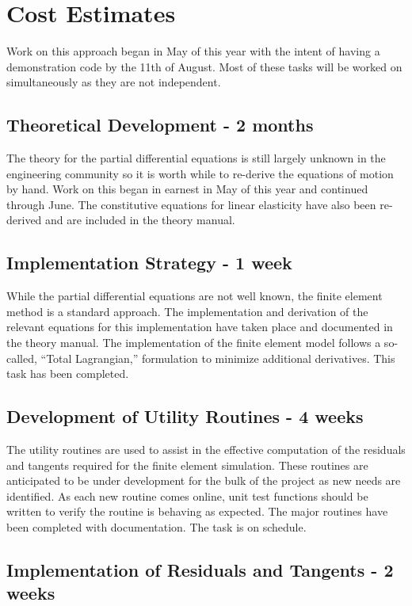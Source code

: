 \section{Cost Estimates}

Work on this approach began in May of this year with the intent of having a demonstration code by the 11th of August. Most of these tasks will be worked on simultaneously as they are not independent.

\subsection{Theoretical Development - 2 months}
The theory for the partial differential equations is still largely unknown in the engineering community so it is worth while to re-derive the equations of motion by hand. Work on this began in earnest in May of this year and continued through June. The constitutive equations for linear elasticity have also been re-derived and are included in the theory manual.

\subsection{Implementation Strategy - 1 week}

While the partial differential equations are not well known, the finite element method is a standard approach. The implementation and derivation of the relevant equations for this implementation have taken place and documented in the theory manual. The implementation of the finite element model follows a so-called, ``Total Lagrangian,'' formulation to minimize additional derivatives. This task has been completed.

\subsection{Development of Utility Routines - 4 weeks}

The utility routines are used to assist in the effective computation of the residuals and tangents required for the finite element simulation. These routines are anticipated to be under development for the bulk of the project as new needs are identified. As each new routine comes online, unit test functions should be written to verify the routine is behaving as expected. The major routines have been completed with documentation. The task is on schedule.

\subsection{Implementation of Residuals and Tangents - 2 weeks}

